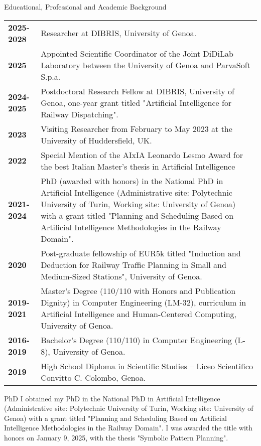 \documentclass{resume} %
\begin{document}

\begin{rSection}{Educational, Professional and Academic Background}

\begin{tabularx}{0.95\textwidth} {lp{14cm}}
 \textbf{2025-2028} & Researcher at DIBRIS, University of Genoa.  \\
 \textbf{2025} & Appointed Scientific Coordinator of the Joint DiDiLab Laboratory between the University of Genoa and ParvaSoft S.p.a.  \\
 \textbf{2024-2025} & Postdoctoral Research Fellow at DIBRIS, University of Genoa, one-year grant titled "Artificial Intelligence for Railway Dispatching".  \\
 \textbf{2023}  & Visiting Researcher from February to May 2023 at the University of Huddersfield, UK.\\
  \textbf{2022}  & Special Mention of the AIxIA Leonardo Lesmo Award for the best Italian Master's thesis in Artificial Intelligence\\
 \textbf{2021-2024}  & PhD (awarded with honors) in the National PhD in Artificial Intelligence (Administrative site: Polytechnic University of Turin, Working site: University of Genoa) with a grant titled "Planning and Scheduling Based on Artificial Intelligence Methodologies in the Railway Domain".\\
 \textbf{2020} & Post-graduate fellowship of EUR5k titled "Induction and Deduction for Railway Traffic Planning in Small and Medium-Sized Stations", University of Genoa. \\
 \textbf{2019-2021}  & Master’s Degree (110/110 with Honors and Publication Dignity) in Computer Engineering (LM-32), curriculum in Artificial Intelligence and Human-Centered Computing, University of Genoa.  \\
 \textbf{2016-2019}  & Bachelor’s Degree (110/110) in Computer Engineering (L-8), University of Genoa. \\
 \textbf{2019}  & High School Diploma in Scientific Studies – Liceo Scientifico Convitto C. Colombo, Genoa. 
\end{tabularx}
\end{rSection}
\begin{rSection}{PhD}
	I obtained my PhD in the National PhD in Artificial Intelligence (Administrative site: Polytechnic University of Turin, Working site: University of Genoa) with a grant titled "Planning and Scheduling Based on Artificial Intelligence Methodologies in the Railway Domain". I was awarded the title with honors on January 9, 2025, with the thesis "Symbolic Pattern Planning".
\end{rSection}
\end{document}
